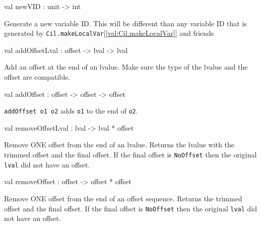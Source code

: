 \documentclass[11pt]{article}
\begin{document}
\label{val:Cil.newVID}\begin{ocamldoccode}
val newVID : unit -> int
\end{ocamldoccode}
\begin{ocamldocdescription}
Generate a new variable ID. This will be different than any variable ID 
 that is generated by {\tt{Cil.makeLocalVar}}[\ref{val:Cil.makeLocalVar}] and friends


\end{ocamldocdescription}




\label{val:Cil.addOffsetLval}\begin{ocamldoccode}
val addOffsetLval : offset -> lval -> lval
\end{ocamldoccode}
\begin{ocamldocdescription}
Add an offset at the end of an lvalue. Make sure the type of the lvalue 
 and the offset are compatible.


\end{ocamldocdescription}




\label{val:Cil.addOffset}\begin{ocamldoccode}
val addOffset : offset -> offset -> offset
\end{ocamldoccode}
\begin{ocamldocdescription}
{\tt{addOffset o1 o2}} adds {\tt{o1}} to the end of {\tt{o2}}.


\end{ocamldocdescription}




\label{val:Cil.removeOffsetLval}\begin{ocamldoccode}
val removeOffsetLval : lval -> lval * offset
\end{ocamldoccode}
\begin{ocamldocdescription}
Remove ONE offset from the end of an lvalue. Returns the lvalue with the 
 trimmed offset and the final offset. If the final offset is {\tt{NoOffset}} 
 then the original {\tt{lval}} did not have an offset.


\end{ocamldocdescription}




\label{val:Cil.removeOffset}\begin{ocamldoccode}
val removeOffset : offset -> offset * offset
\end{ocamldoccode}
\begin{ocamldocdescription}
Remove ONE offset from the end of an offset sequence. Returns the 
 trimmed offset and the final offset. If the final offset is {\tt{NoOffset}} 
 then the original {\tt{lval}} did not have an offset.


\end{ocamldocdescription}
\end{document}
